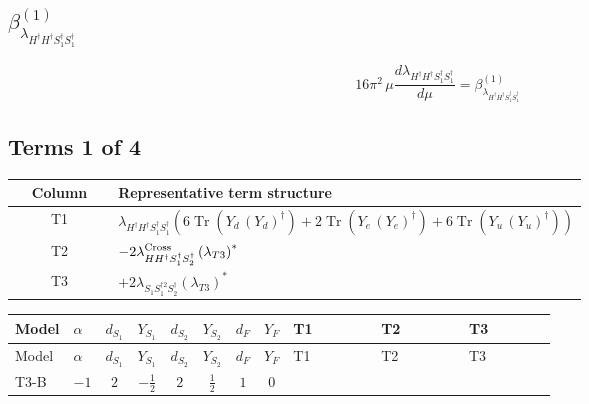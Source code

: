 \documentclass[8pt]{article}
\begin{document}
\begin{landscape}
\section*{$\beta_{\lambda_{H^\dagger H^\dagger S_1^\dagger S_1^\dagger}}^{(1)}$}
\[16\pi^2\,\mu\frac{d \lambda_{H^\dagger H^\dagger S_1^\dagger S_1^\dagger}}{d\mu}=\beta_{\lambda_{H^\dagger H^\dagger S_1^\dagger S_1^\dagger}}^{(1)}\]
\subsection*{Terms 1 of 4}
\begin{center}
\begin{tabular}{@{}c >{\raggedright\arraybackslash}p{0.82\linewidth}@{}}
\toprule
Column & Representative term structure \\
\midrule
T1 & \(\displaystyle {\lambda_{H^\dagger H^\dagger S_1^\dagger S_1^\dagger}} (6 \operatorname{Tr}\!\left({Y_d}\,\left({Y_d}\right)^{\dagger}\right)+2 \operatorname{Tr}\!\left({Y_e}\,\left({Y_e}\right)^{\dagger}\right)+6 \operatorname{Tr}\!\left({Y_u}\,\left({Y_u}\right)^{\dagger}\right))\) \\
\midrule
T2 & \(\displaystyle -2 {\lambda_{H H^\dagger S_1^\dagger S_2^\dagger}^{\rm Cross}} \left({\lambda_{T3}}\right)^{*}\) \\
\midrule
T3 & \(\displaystyle +2 {\lambda_{S_1 S_1^{\dagger 2}S_2^\dagger}} \left({\lambda_{T3}}\right)^{*}\) \\
\midrule
\bottomrule
\end{tabular}
\end{center}
\smallskip
\tiny
\begin{longtable}{@{}llcccccc >{\raggedright\arraybackslash}p{0.21\linewidth} >{\raggedright\arraybackslash}p{0.21\linewidth} >{\raggedright\arraybackslash}p{0.21\linewidth}@{}}
\toprule
Model & $\alpha$ & $d_{S_1}$ & $Y_{S_1}$ & $d_{S_2}$ & $Y_{S_2}$ & $d_F$ & $Y_F$ & T1 & T2 & T3 \\
\midrule
\endfirsthead
\toprule
Model & $\alpha$ & $d_{S_1}$ & $Y_{S_1}$ & $d_{S_2}$ & $Y_{S_2}$ & $d_F$ & $Y_F$ & T1 & T2 & T3 \\
\midrule
\endhead
T3-B & $-1$ & $2$ & $-\frac{1}{2}$ & $2$ & $\frac{1}{2}$ & $1$ & $0$ & \scriptsize\adjustbox{max width=\linewidth}{$\begin{gathered} {\lambda_{H^\dagger H^\dagger S_1^\dagger S_1^\dagger}} (6 \operatorname{Tr}\!\left({Y_d}\,\left({Y_d}\right)^{\dagger}\right)+2 \operatorname{Tr}\!\left({Y_e}\,\left({Y_e}\right)^{\dagger}\right)+6 \operatorname{Tr}\!\left({Y_u}\,\left({Y_u}\right)^{\dagger}\right))\end{gathered}$} & \scriptsize\adjustbox{max width=\linewidth}{$\begin{gathered} -2 {\lambda_{H H^\dagger S_1^\dagger S_2^\dagger}^{\rm Cross}} \left({\lambda_{T3}}\right)^{*}\end{gathered}$} & \scriptsize\adjustbox{max width=\linewidth}{$\begin{gathered} +2 {\lambda_{S_1 S_1^{\dagger 2}S_2^\dagger}} \left({\lambda_{T3}}\right)^{*}\end{gathered}$} \\

\end{longtable}
\end{landscape}
\end{document}
